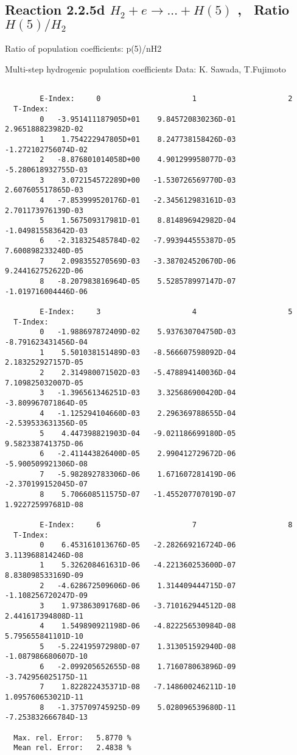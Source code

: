 \documentclass[12pt,dvipdfmx]{article}
\begin{document}
\subsection{
Reaction 2.2.5d  $H_2 + e \rightarrow ...+ H(5)  $ , \  Ratio $H(5)/H_2 $
}

 Ratio of population coefficients: p(5)/nH2

 Multi-step hydrogenic population coefficients
 Data: K. Sawada, T.Fujimoto \cite{kn:Sawada}


\begin{small}\begin{verbatim}

        E-Index:     0                     1                     2
  T-Index:
        0   -3.951411187905D+01    9.845720830236D-01    2.965188823982D-02
        1    1.754222947805D+01    8.247738158426D-03   -1.272102756074D-02
        2   -8.876801014058D+00    4.901299958077D-03   -5.280618932755D-03
        3    3.072154572289D+00   -1.530726569770D-03    2.607605517865D-03
        4   -7.853999520176D-01   -2.345612983161D-03    2.701173976139D-03
        5    1.567509317981D-01    8.814896942982D-04   -1.049815583642D-03
        6   -2.318325485784D-02   -7.993944555387D-05    7.600898233240D-05
        7    2.098355270569D-03   -3.387024520670D-06    9.244162752622D-06
        8   -8.207983816964D-05    5.528578997147D-07   -1.019716004446D-06

        E-Index:     3                     4                     5
  T-Index:
        0   -1.988697872409D-02    5.937630704750D-03   -8.791623431456D-04
        1    5.501038151489D-03   -8.566607598092D-04    2.183252927157D-05
        2    2.314980071502D-03   -5.478894140036D-04    7.109825032007D-05
        3   -1.396561346251D-03    3.325686900420D-04   -3.809967071864D-05
        4   -1.125294104660D-03    2.296369788655D-04   -2.539533631356D-05
        5    4.447398821903D-04   -9.021186699180D-05    9.582338741375D-06
        6   -2.411443826400D-05    2.990412729672D-06   -5.900509921306D-08
        7   -5.982892783306D-06    1.671607281419D-06   -2.370199152045D-07
        8    5.706608511575D-07   -1.455207707019D-07    1.922725997681D-08

        E-Index:     6                     7                     8
  T-Index:
        0    6.453161013676D-05   -2.282669216724D-06    3.113968814246D-08
        1    5.326208461631D-06   -4.221360253600D-07    8.838098533169D-09
        2   -4.628672509606D-06    1.314409444715D-07   -1.108256720247D-09
        3    1.973863091768D-06   -3.710162944512D-08    2.441617394808D-11
        4    1.549890921198D-06   -4.822256530984D-08    5.795655841101D-10
        5   -5.224195972980D-07    1.313051592940D-08   -1.087986680607D-10
        6   -2.099205652655D-08    1.716078063896D-09   -3.742956025175D-11
        7    1.822822435371D-08   -7.148600246211D-10    1.095760653021D-11
        8   -1.375709745925D-09    5.028096539680D-11   -7.253832666784D-13

  Max. rel. Error:   5.8770 %
  Mean rel. Error:   2.4838 %



\end{verbatim}\end{small}
\end{document}
